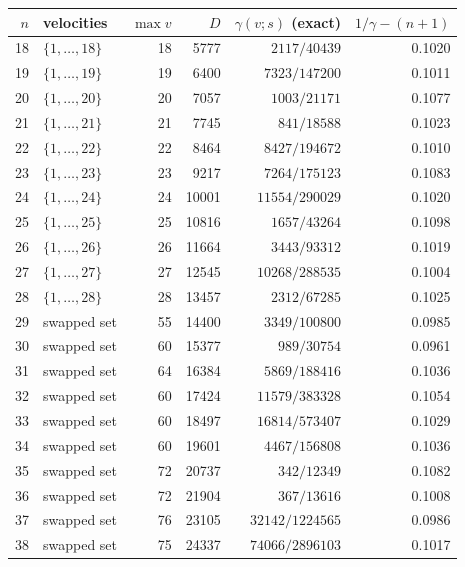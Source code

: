 \begin{center}\scriptsize\begin{tabular}{rlrrrr}\toprule
$n$ & velocities & $\max v$ & $D$ & $\gamma(v;s)$ (exact) & $1/\gamma-(n+1)$\\\midrule
18 & $\{1,\dots,18\}$ & 18 & 5777 & $2117/40439$ & 0.1020\\
19 & $\{1,\dots,19\}$ & 19 & 6400 & $7323/147200$ & 0.1011\\
20 & $\{1,\dots,20\}$ & 20 & 7057 & $1003/21171$ & 0.1077\\
21 & $\{1,\dots,21\}$ & 21 & 7745 & $841/18588$ & 0.1023\\
22 & $\{1,\dots,22\}$ & 22 & 8464 & $8427/194672$ & 0.1010\\
23 & $\{1,\dots,23\}$ & 23 & 9217 & $7264/175123$ & 0.1083\\
24 & $\{1,\dots,24\}$ & 24 & 10001 & $11554/290029$ & 0.1020\\
25 & $\{1,\dots,25\}$ & 25 & 10816 & $1657/43264$ & 0.1098\\
26 & $\{1,\dots,26\}$ & 26 & 11664 & $3443/93312$ & 0.1019\\
27 & $\{1,\dots,27\}$ & 27 & 12545 & $10268/288535$ & 0.1004\\
28 & $\{1,\dots,28\}$ & 28 & 13457 & $2312/67285$ & 0.1025\\
29 & swapped set & 55 & 14400 & $3349/100800$ & 0.0985\\
30 & swapped set & 60 & 15377 & $989/30754$ & 0.0961\\
31 & swapped set & 64 & 16384 & $5869/188416$ & 0.1036\\
32 & swapped set & 60 & 17424 & $11579/383328$ & 0.1054\\
33 & swapped set & 60 & 18497 & $16814/573407$ & 0.1029\\
34 & swapped set & 60 & 19601 & $4467/156808$ & 0.1036\\
35 & swapped set & 72 & 20737 & $342/12349$ & 0.1082\\
36 & swapped set & 72 & 21904 & $367/13616$ & 0.1008\\
37 & swapped set & 76 & 23105 & $32142/1224565$ & 0.0986\\
38 & swapped set & 75 & 24337 & $74066/2896103$ & 0.1017\\
\bottomrule\end{tabular}\end{center}
